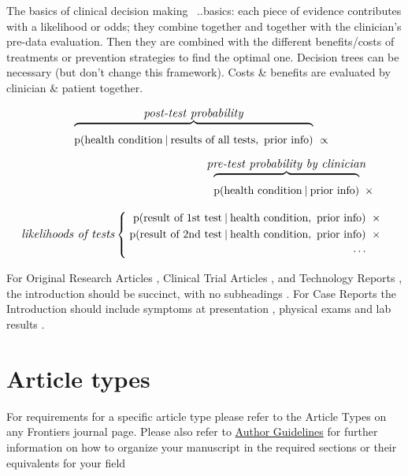 \documentclass[utf8]{FrontiersinHarvard} %
\newcommand*{\wrench}{{\fontencoding{U}\fontfamily{fontawesomethree}\selectfont\symbol{114}}}
\newcommand{\mynotew}[1]{{\color{notecolour}\wrench\ #1}}
\newcommand*{\p}{\mathrm{p}}%
\renewcommand*{\|}[1][]{\nonscript\:#1\vert\nonscript\:\mathopen{}}
\newcommand*{\zerob}[1]{\makebox[0pt][c]{#1}}
\begin{document}
The basics of clinical decision making \mynotew{..basics: each piece of evidence contributes with a likelihood or odds; they combine together and together with the clinician's pre-data evaluation. Then they are combined with the different benefits/costs of treatments or prevention strategies to find the optimal one. Decision trees can be necessary (but don't change this framework). Costs \& benefits are evaluated by clinician \& patient together.}


\begin{multline}\label{eq:bayes_theorem_intro}
    \overbrace{\vphantom{\bigg\{}\p(\text{health condition}\|
      \text{results of all tests},\ 
      \text{prior info})}^{\zerob{\scriptsize\emph{post-test probability}}}
    \mathrel{\ \propto\ }{}
    \\
    \shoveright{\overbrace{\vphantom{\bigg\{}\p(\text{health condition} \|
      \text{prior info})}^{\zerob{\scriptsize\emph{pre-test probability by clinician}}}
  \mathbin{\ \times\ }{}}    
    \\[\jot]
\text{\scriptsize\emph{likelihoods of tests}}\left\{\;  \begin{aligned}
 \p(\text{result of 1st test} \| \text{health condition} ,\ 
  \text{prior info})
  &\mathbin{\ \times\ }{}\\
  \p(\text{result of 2nd test} \| \text{health condition} ,\ 
  \text{prior info})
  &\mathbin{\ \times\ }{}
\\
{}\dotsb &
  \end{aligned}\right.
\end{multline}


{\color{yellow}\tiny For Original Research Articles \citep{conference}, Clinical Trial Articles \citep{article}, and Technology Reports \citep{patent}, the introduction should be succinct, with no subheadings \citep{book}. For Case Reports the Introduction should include symptoms at presentation \citep{chapter}, physical exams and lab results \citep{dataset}.

}



\section{Article types}

For requirements for a specific article type please refer to the Article Types on any Frontiers journal page. Please also refer to  \href{http://home.frontiersin.org/about/author-guidelines#Sections}{Author Guidelines} for further information on how to organize your manuscript in the required sections or their equivalents for your field
\end{document}
